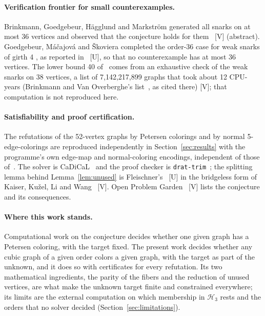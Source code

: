 \documentclass[11pt]{article}
\theoremstyle{definition}
\theoremstyle{remark}
\newcommand{\Hthree}{\mathcal{H}_3}
\newcommand{\evV}{\textnormal{[V]}}
\newcommand{\evU}{\textnormal{[U]}}
\begin{document}
\paragraph{Verification frontier for small counterexamples.} Brinkmann, Goedgebeur, H\"agglund and
Markstr\"om generated all snarks on at most 36 vertices and observed that the conjecture holds for them~\cite{Brinkmann2013}
\evV{} (abstract). Goedgebeur, M\'a\v{c}ajov\'a and \v{S}koviera completed the order-36 case for weak snarks of girth 4
\cite{GMS2019}, as reported in~\cite{GJMMMU2026} \evU{}, so that no counterexample has at most 36 vertices. The lower bound 40 of~\cite{GJMMMU2026} comes
from an exhaustive check of the weak snarks on 38 vertices, a list of 7,142,217,899 graphs that took about 12 CPU-years
(Brinkmann and Van Overberghe's list~\cite{BrinkmannVO}, as cited there) \evV{}; that computation is not reproduced here.

\paragraph{Satisfiability and proof certification.} The refutations of the 52-vertex graphs by Petersen colorings
and by normal 5-edge-colorings are reproduced independently in Section~\ref{sec:results} with the programme's own edge-map and normal-coloring
encodings, independent of those of~\cite{Putman2026}. The solver is CaDiCaL~\cite{CaDiCaL} and the proof checker is
\texttt{drat-trim}~\cite{DRATtrim}; the splitting lemma behind Lemma~\ref{lem:unused} is Fleischner's~\cite{Fleischner1992} \evU{} in the
bridgeless form of Kaiser, Ku\v{z}el, Li and Wang~\cite{KaiserKLW2007} \evV{}. Open Problem Garden~\cite{OPG} \evV{} lists the conjecture and its
consequences.

\paragraph{Where this work stands.} Computational work on the conjecture decides whether one given graph has a
Petersen coloring, with the target fixed. The present work decides whether any cubic graph of a given order colors a given
graph, with the target as part of the unknown, and it does so with certificates for every refutation. Its two mathematical
ingredients, the parity of the fibers and the reduction of unused vertices, are what make the unknown target finite
and constrained everywhere; its limits are the external computation on which membership in $\Hthree$ rests and the orders
that no solver decided (Section~\ref{sec:limitations}).
\end{document}

